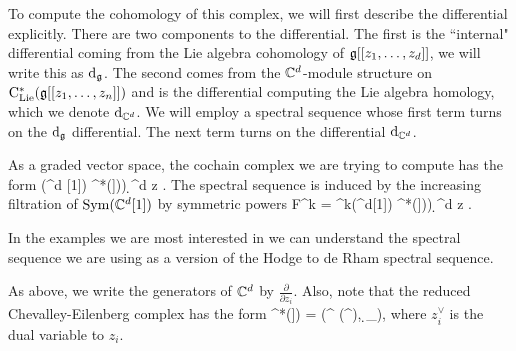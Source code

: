 \documentclass[10pt]{amsart}
\begin{document}
To compute the cohomology of this complex, we will first describe the differential explicitly. 
There are two components to the differential.
The first is the ``internal" differential coming from the Lie algebra cohomology of $\mathfrak g [[z_1,\ldots,z_d]]$, we will write this as ${\rm d}_{\mathfrak g}$. 
The second comes from the $\mathbb C^d$-module structure on ${\rm C}_{{\rm Lie}}^*(\mathfrak g[[z_1,\ldots,z_n]])$ and is the differential computing the Lie algebra homology, which we denote ${\rm d}_{\mathbb C^d}$. 
We will employ a spectral sequence whose first term turns on the ${\rm d}_{\mathfrak g}$ differential.
The next term turns on the differential ${\rm d}_{\mathbb C^d}$.

As a graded vector space, the cochain complex we are trying to compute has the form
\ben
\Sym(\CC^d [1]) \tensor \cred^*\left(\fg[[z_1,\ldots,z_d]])\right) \d^d z .
\een
The spectral sequence is induced by the increasing filtration of ${\rm Sym}(\mathbb C^d [1])$ by symmetric powers
\ben
F^k = \Sym^{\leq k}(\CC^d[1]) \tensor \cred^*\left(\fg[[z_1,\ldots,z_d]])\right) \d^d z .
\een

\begin{rmk}
In the examples we are most interested in we can understand the spectral sequence we are using as a version of the Hodge to de Rham spectral sequence.
\end{rmk}

As above, we write the generators of $\mathbb C^d$ by $\frac{\partial}{\partial z_i}$. 
Also, note that the reduced Chevalley-Eilenberg complex has the form
\ben
\cred^*(\fg[[z_1,\ldots,z_n]]) = \left(\Sym^{} \left(\fg^ \right), \d_{\fg}\right),
\een
where $z_i^\vee$ is the dual variable to $z_i$. 
\end{document}
